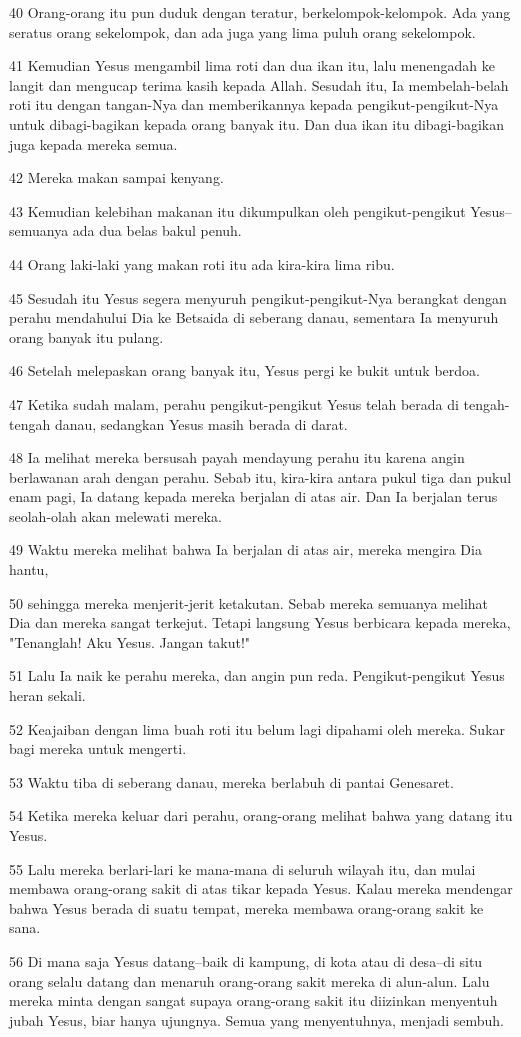 \par 40 Orang-orang itu pun duduk dengan teratur, berkelompok-kelompok. Ada yang seratus orang sekelompok, dan ada juga yang lima puluh orang sekelompok.
\par 41 Kemudian Yesus mengambil lima roti dan dua ikan itu, lalu menengadah ke langit dan mengucap terima kasih kepada Allah. Sesudah itu, Ia membelah-belah roti itu dengan tangan-Nya dan memberikannya kepada pengikut-pengikut-Nya untuk dibagi-bagikan kepada orang banyak itu. Dan dua ikan itu dibagi-bagikan juga kepada mereka semua.
\par 42 Mereka makan sampai kenyang.
\par 43 Kemudian kelebihan makanan itu dikumpulkan oleh pengikut-pengikut Yesus--semuanya ada dua belas bakul penuh.
\par 44 Orang laki-laki yang makan roti itu ada kira-kira lima ribu.
\par 45 Sesudah itu Yesus segera menyuruh pengikut-pengikut-Nya berangkat dengan perahu mendahului Dia ke Betsaida di seberang danau, sementara Ia menyuruh orang banyak itu pulang.
\par 46 Setelah melepaskan orang banyak itu, Yesus pergi ke bukit untuk berdoa.
\par 47 Ketika sudah malam, perahu pengikut-pengikut Yesus telah berada di tengah-tengah danau, sedangkan Yesus masih berada di darat.
\par 48 Ia melihat mereka bersusah payah mendayung perahu itu karena angin berlawanan arah dengan perahu. Sebab itu, kira-kira antara pukul tiga dan pukul enam pagi, Ia datang kepada mereka berjalan di atas air. Dan Ia berjalan terus seolah-olah akan melewati mereka.
\par 49 Waktu mereka melihat bahwa Ia berjalan di atas air, mereka mengira Dia hantu,
\par 50 sehingga mereka menjerit-jerit ketakutan. Sebab mereka semuanya melihat Dia dan mereka sangat terkejut. Tetapi langsung Yesus berbicara kepada mereka, "Tenanglah! Aku Yesus. Jangan takut!"
\par 51 Lalu Ia naik ke perahu mereka, dan angin pun reda. Pengikut-pengikut Yesus heran sekali.
\par 52 Keajaiban dengan lima buah roti itu belum lagi dipahami oleh mereka. Sukar bagi mereka untuk mengerti.
\par 53 Waktu tiba di seberang danau, mereka berlabuh di pantai Genesaret.
\par 54 Ketika mereka keluar dari perahu, orang-orang melihat bahwa yang datang itu Yesus.
\par 55 Lalu mereka berlari-lari ke mana-mana di seluruh wilayah itu, dan mulai membawa orang-orang sakit di atas tikar kepada Yesus. Kalau mereka mendengar bahwa Yesus berada di suatu tempat, mereka membawa orang-orang sakit ke sana.
\par 56 Di mana saja Yesus datang--baik di kampung, di kota atau di desa--di situ orang selalu datang dan menaruh orang-orang sakit mereka di alun-alun. Lalu mereka minta dengan sangat supaya orang-orang sakit itu diizinkan menyentuh jubah Yesus, biar hanya ujungnya. Semua yang menyentuhnya, menjadi sembuh.

